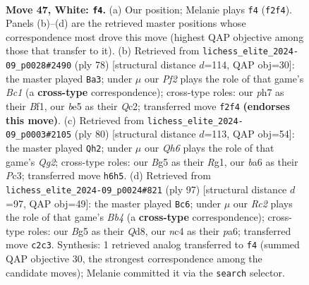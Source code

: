 \documentclass[11pt]{article}
\begin{document}
\clearpage

\begin{figure}[p]\centering
\begin{subfigure}{0.46\textwidth}\centering
\resizebox{\linewidth}{!}{%
\newchessgame
\chessboard[
  setfen={1q6/r4k1p/b3p2Q/p2pbpB1/P1np3P/8/2R2P2/RN2N1K1 w - - 14 47},
  showmover=false,
  pgfstyle=straightmove, color=movearrow, markmove={f2-f4}
]}
\caption{}
\end{subfigure}\hfill
\begin{subfigure}{0.46\textwidth}\centering
\resizebox{\linewidth}{!}{%
\newchessgame
\chessboard[
  setfen={1q3rk1/2R2pb1/b4npp/4N3/3pPP2/3P3P/2Q5/2B2BK1 w - - 15 40},
  showmover=false,
  pgfstyle=straightmove, color=movearrow, markmove={c1-a3}
]}
\caption{}
\end{subfigure}
\\[4pt]
\begin{subfigure}{0.46\textwidth}\centering
\resizebox{\linewidth}{!}{%
\newchessgame
\chessboard[
  setfen={6r1/2p1q1bk/1p5p/p3Nb2/P3pP2/1PP1B3/1K4Q1/6R1 w - - 6 41},
  showmover=false,
  pgfstyle=straightmove, color=movearrow, markmove={g2-h2}
]}
\caption{}
\end{subfigure}\hfill
\begin{subfigure}{0.46\textwidth}\centering
\resizebox{\linewidth}{!}{%
\newchessgame
\chessboard[
  setfen={3q2k1/p4p2/Pn4p1/1b4r1/2p4p/4P2P/Q3NPP1/1R3BK1 b - - 5 49},
  showmover=false,
  pgfstyle=straightmove, color=movearrow, markmove={b5-c6}
]}
\caption{}
\end{subfigure}
\caption{\textbf{Move 47, White: \texttt{f4}.} (a) Our position; Melanie plays \texttt{f4} (\texttt{f2f4}). Panels (b)--(d) are the retrieved master positions whose correspondence most drove this move (highest QAP objective among those that transfer to it). (b) Retrieved from \texttt{lichess\_elite\_2024-09\_p0028\#2490} (ply 78) [structural distance $d$=114, QAP obj=30]: the master played \texttt{Ba3}; under $\mu$ our \emph{Pf2} plays the role of that game's \emph{Bc1} (a \textbf{cross-type} correspondence); cross-type roles: our \emph{p}h7 as their \emph{B}f1, our \emph{b}e5 as their \emph{Q}c2; transferred move \texttt{f2f4} \textbf{(endorses this move)}. (c) Retrieved from \texttt{lichess\_elite\_2024-09\_p0003\#2105} (ply 80) [structural distance $d$=113, QAP obj=54]: the master played \texttt{Qh2}; under $\mu$ our \emph{Qh6} plays the role of that game's \emph{Qg2}; cross-type roles: our \emph{B}g5 as their \emph{R}g1, our \emph{b}a6 as their \emph{P}c3; transferred move \texttt{h6h5}. (d) Retrieved from \texttt{lichess\_elite\_2024-09\_p0024\#821} (ply 97) [structural distance $d$=97, QAP obj=49]: the master played \texttt{Bc6}; under $\mu$ our \emph{Rc2} plays the role of that game's \emph{Bb4} (a \textbf{cross-type} correspondence); cross-type roles: our \emph{B}g5 as their \emph{Q}d8, our \emph{n}c4 as their \emph{p}a6; transferred move \texttt{c2c3}. Synthesis: 1 retrieved analog transferred to \texttt{f4} (summed QAP objective 30, the strongest correspondence among the candidate moves); Melanie committed it via the \texttt{search} selector.}
\label{fig:thought-m92}
\end{figure}
\end{document}
